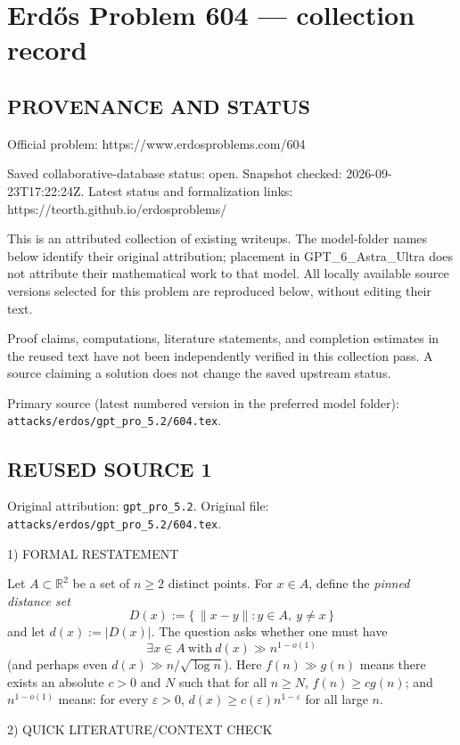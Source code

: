 \section*{Erd\H{o}s Problem 604 --- collection record}

\subsection*{PROVENANCE AND STATUS}
Official problem: https://www.erdosproblems.com/604

Saved collaborative-database status: open.
Snapshot checked: 2026-09-23T17:22:24Z.
Latest status and formalization links: https://teorth.github.io/erdosproblems/

This is an attributed collection of existing writeups. The model-folder names below identify their original attribution; placement in GPT\_6\_Astra\_Ultra does not attribute their mathematical work to that model. All locally available source versions selected for this problem are reproduced below, without editing their text.

Proof claims, computations, literature statements, and completion estimates in the reused text have not been independently verified in this collection pass. A source claiming a solution does not change the saved upstream status.

Primary source (latest numbered version in the preferred model folder): \texttt{attacks/erdos/gpt\_pro\_5.2/604.tex}.

\subsection*{REUSED SOURCE 1}
Original attribution: \texttt{gpt\_pro\_5.2}.
Original file: \texttt{attacks/erdos/gpt\_pro\_5.2/604.tex}.


1) FORMAL RESTATEMENT

Let $A\subset\mathbb R^2$ be a set of $n\ge 2$ distinct points.
For $x\in A$, define the \emph{pinned distance set}
\[
D(x):=\{\,\|x-y\|: y\in A,\ y\neq x\,\}
\]
and let $d(x):=|D(x)|$.
The question asks whether one must have
\[
\exists x\in A\ \text{with}\ d(x)\gg n^{1-o(1)}
\]
(and perhaps even $d(x)\gg n/\sqrt{\log n}$).
Here $f(n)\gg g(n)$ means there exists an absolute $c>0$ and $N$ such that for all $n\ge N$, $f(n)\ge c g(n)$; and $n^{1-o(1)}$ means: for every $\varepsilon>0$, $d(x)\ge c(\varepsilon)n^{1-\varepsilon}$ for all large $n$.

2) QUICK LITERATURE/CONTEXT CHECK

